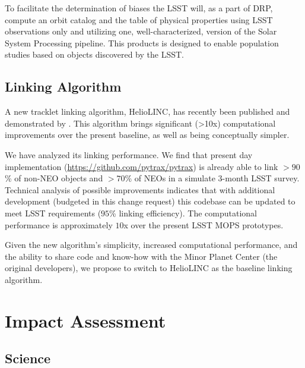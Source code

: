 \documentclass[DM,authoryear,toc,lsstdraft]{lsstdoc}
\begin{document}
To facilitate the determination of biases the LSST will, as a part of DRP, compute an orbit catalog and the table of physical properties using LSST observations only and utilizing one, well-characterized, version of the Solar System Processing pipeline. This products is designed to enable population studies based on objects discovered by the LSST.

\subsection{Linking Algorithm}

A new tracklet linking algorithm, HelioLINC, has recently been published and demonstrated by \cite{heliolinc}. This algorithm brings significant (>10x) computational improvements over the present baseline, as well as being conceptually simpler.

We have analyzed its linking performance. We find that present day implementation (\url{https://github.com/pytrax/pytrax}) is already able to link $> 90$\% of non-NEO objects and $> 70$\% of NEOs in a simulate 3-month LSST survey. Technical analysis of possible improvements indicates that with additional development (budgeted in this change request) this codebase can be updated to meet LSST requirements ($95$\% linking efficiency). The computational performance is approximately $10$x over the present LSST MOPS prototypes.

Given the new algorithm's simplicity, increased computational performance, and the ability to share code and know-how with the Minor Planet Center (the original developers), we propose to switch to HelioLINC as the baseline linking algorithm.

\section{Impact Assessment}

\subsection{Science}
\end{document}
